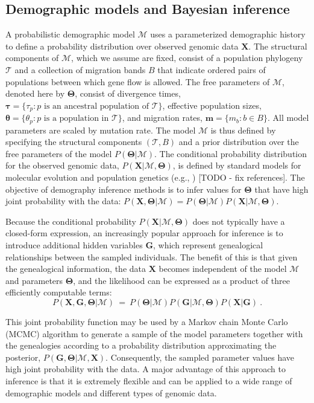 \documentclass[11pt]{article}
\newcommand{\vect}[1]{\boldsymbol{\mathbf{#1}}}
\newcommand{\X}{\vect{X}}
\newcommand{\M}{\mathcal{M}}
\newcommand{\Tr}{\mathcal{T}}
\newcommand{\G}{\vect{G}}
\newcommand{\T}{\vect{\Theta}}
\newcommand{\1}{\mathbbm{1}}
\newcommand{\taus}{\vect\tau}
\newcommand{\thetas}{\vect\theta}
\newcommand{\migs}{\vect{m}}
\begin{document}
\subsection{Demographic models and Bayesian inference}




A probabilistic demographic model $\M$ uses a parameterized demographic history to define a probability distribution over observed genomic data $\X$.
%
The structural components of $\M$, which we assume are fixed, consist of a population phylogeny $\Tr$ and a collection
of migration bands $B$ that indicate ordered pairs of populations between which gene flow is allowed.
%
The free parameters of $\M$, denoted here by $\T$, consist of divergence times, $\taus=\{\tau_p:p \text{ is an ancestral population of } \Tr\}$,
effective population sizes, $\thetas=\{\theta_p: p \text{ is a population in } \Tr\}$, and migration rates, $\migs=\{m_b:b \in B\}$.
%
All model parameters are scaled by mutation rate.
%
The model $\M$ is thus defined by specifying the structural components $(\Tr,B)$ and a prior distribution over the free parameters of the model $P(\T|\M)$.
%
The conditional probability distribution for the observed genomic data, $P(\X|\M,\T)$, is defined by standard models for molecular evolution and population genetics (e.g., \cite{JUKECANT69,KING82A}) [TODO - fix references].
%
The objective of demography inference methods is to infer values for $\T$ that have high joint probability with the data:
$P(\X,\T|\M)=P(\T|\M)P(\X|\M,\T)$.

%
Because the conditional probability $P(\X|\M,\T)$ does not typically have a closed-form expression, an increasingly popular approach for
inference is to introduce additional hidden variables $\G$, which represent genealogical relationships
between the sampled individuals.
%
The benefit of this is that given the genealogical information, the data $\X$ becomes independent of the model $\M$ and parameters $\T$,
and the likelihood can be expressed as a product of three efficiently computable terms:
%
%
\begin{equation}\label{eq:likelihood}
 P(\X,\G,\T|\M) ~=~ P(\T|\M) P(\G|\M,\T) P(\X|\G)~.
\end{equation}
%
%

This joint probability function may be used by a Markov chain Monte Carlo (MCMC) algorithm to generate a sample of the model parameters
together with the genealogies according to a probability distribution approximating the posterior, $P(\G,\T|\M,\X)$.
%
Consequently, the sampled parameter values have high joint probability with the data.
%
A major advantage of this approach to inference is that it is extremely flexible and can be applied to a wide range of demographic models and
different types of genomic data.
%
\end{document}
